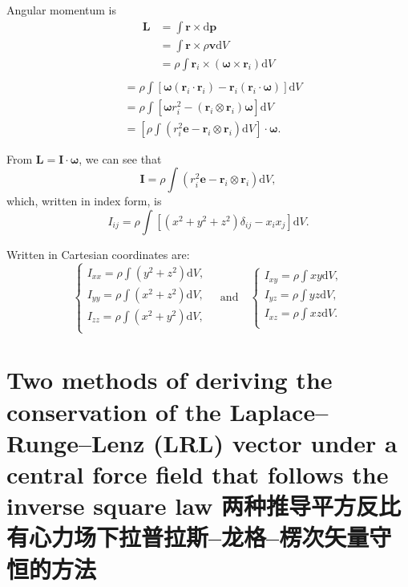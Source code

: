 Angular momentum is \begin{align*}
    \boldsymbol L & = \int \boldsymbol r \times \mathrm d \boldsymbol p \\
    & = \int \boldsymbol r \times \rho \boldsymbol v \mathrm dV \\
    & = \rho \int \boldsymbol r_i \times (\boldsymbol \omega \times \boldsymbol r_i) \mathrm dV \\
\end{align*}
\begin{align*}
    & = \rho \int [\boldsymbol \omega (\boldsymbol r_i \cdot \boldsymbol r_i) - \boldsymbol r_i (\boldsymbol r_i \cdot \boldsymbol \omega)] \mathrm dV \\
    & = \rho \int [\boldsymbol \omega r_i^2 - (\boldsymbol r_i \otimes \boldsymbol r_i) \boldsymbol \omega] \mathrm dV \\
    & = \left[ \rho \int (r_i^2 \mathbf e - \boldsymbol r_i \otimes \boldsymbol r_i) \mathrm dV \right] \cdot \boldsymbol \omega.
\end{align*}

From \(\boldsymbol L = \boldsymbol I \cdot \boldsymbol \omega\), we can
see that
\[\boldsymbol I = \rho \int (r_i^2 \mathbf e - \boldsymbol r_i \otimes \boldsymbol r_i) \mathrm dV,\]
which, written in index form, is
\[I_{ij} = \rho \int \left[ (x^2 + y^2 + z^2) \delta_{ij} - x_ix_j \right]\mathrm dV.\]

Written in Cartesian coordinates are: \[\left\{
    \begin{array}{l}
        \displaystyle I_{xx} = \rho \int \left( y^2 + z^2 \right) \mathrm dV, \\
        \displaystyle I_{yy} = \rho \int \left( x^2 + z^2 \right) \mathrm dV, \\
        \displaystyle I_{zz} = \rho \int \left( x^2 + y^2 \right) \mathrm dV, \\
    \end{array}
\right.
\quad \text{and} \quad
\left\{
    \begin{array}{l}
        \displaystyle I_{xy} = \rho \int xy \mathrm dV, \\
        \displaystyle I_{yz} = \rho \int yz \mathrm dV, \\
        \displaystyle I_{xz} = \rho \int xz \mathrm dV. \\
    \end{array}
\right.\]

\section[The conservation of the LRL vector 拉普拉斯--龙格--楞次矢量守恒]{Two methods of deriving the conservation of the Laplace--Runge--Lenz (LRL) vector under a central force field that follows the inverse square law 两种推导平方反比有心力场下拉普拉斯--龙格--楞次矢量守恒的方法}\label{two-methods-of-deriving-the-conservation-of-the-laplacerungelenz-lrl-vector-under-a-central-force-field-that-follows-the-inverse-square-law-ux4e24ux79cdux63a8ux5bfcux5e73ux65b9ux53cdux6bd4ux6709ux5fc3ux529bux573aux4e0bux62c9ux666eux62c9ux65af-ux9f99ux683c-ux695eux6b21ux77e2ux91cfux5b88ux6052ux7684ux65b9ux6cd5}

